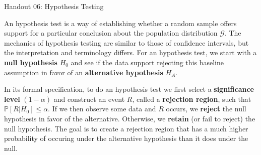 \documentclass{tufte-handout}
\newcommand{\Prob}{\mathbb{P}}
\begin{document}
\justify

{\LARGE Handout 06: Hypothesis Testing}

\vspace*{18pt}

\noindent
An hypothesis test is a way of establishing whether a random sample
offers support for a particular conclusion about the population 
distribution $\mathcal{G}$. The mechanics of hypothesis testing are
similar to those of confidence intervals, but the interpretation and
terminology differs. For an hypothesis test, we start with a
\textbf{null hypothesis} $H_0$ and see if the data support rejecting
this baseline assumption in favor of an \textbf{alternative hypothesis}
$H_A$. 

In its formal specification, to do an hypothesis test we first select
a \textbf{significance level} $(1-\alpha)$ and construct an event $R$,
called a \textbf{rejection region}, such that $\Prob[R | H_0] \leq \alpha$.
If we then observe some data and $R$ occurs, we \textbf{reject} the
null hypothesis in favor of the alternative. Otherwise, we \textbf{retain}
(or fail to reject) the null hypothesis. The goal is to create a rejection
region that has a much higher probability of occuring under the alternative
hypothesis than it does under the null.
\end{document}
